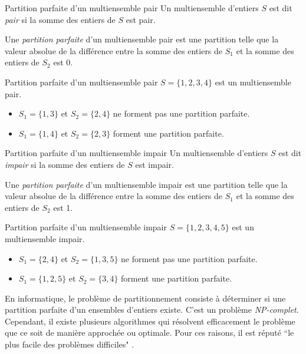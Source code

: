 \documentclass[11pt]{article}
\begin{document}
  \begin{definition}{Partition parfaite d'un multiensemble pair}
    Un multiensemble d'entiers $S$ est dit \emph{pair} si la somme des entiers de $S$ est pair.

    Une \emph{partition parfaite} d'un multiensemble pair est une partition telle que la valeur absolue de la différence entre la somme des entiers de $S_1$ et la somme des entiers de $S_2$ est 0.
  \end{definition}
  
  \begin{exemple}{Partition parfaite d'un multiensemble pair}
    $S = \{1,2,3,4\}$ est un multiensemble pair.

    \begin{itemize}
      \item $S_1 = \{1,3\}$ et $S_2 = \{2,4\}$ ne forment pas une partition parfaite.
      \item $S_1 = \{1,4\}$ et $S_2 = \{2,3\}$ forment une partition parfaite.
    \end{itemize}
  \end{exemple}
  
  \begin{definition}{Partition parfaite d'un multiensemble impair}
    Un multiensemble d'entiers $S$ est dit \emph{impair} si la somme des entiers de $S$ est impair.

    Une \emph{partition parfaite} d'un multiensemble impair est une partition telle que la valeur absolue de la différence entre la somme des entiers de $S_1$ et la somme des entiers de $S_2$ est 1.
  \end{definition}
  
  \begin{exemple}{Partition parfaite d'un multiensemble impair}
    $S = \{1,2,3,4, 5\}$ est un multiensemble impair.

    \begin{itemize}
      \item $S_1 = \{2, 4\}$ et $S_2 = \{1,3,5\}$ ne forment pas une partition parfaite.
      \item $S_1 = \{1, 2, 5\}$ et $S_2 = \{3,4\}$ forment une partition parfaite.
    \end{itemize}
  \end{exemple}

  En informatique, le problème de partitionnement consiste à déterminer si une partition parfaite d'un ensembles d'entiers existe. C'est un problème \emph{NP-complet}. Cependant, il existe plusieurs algorithmes qui résolvent efficacement le problème que ce soit de manière approchée ou optimale. Pour ces raisons, il est réputé ``le plus facile des problèmes difficiles" \cite{Mertens2003}.
\end{document}
